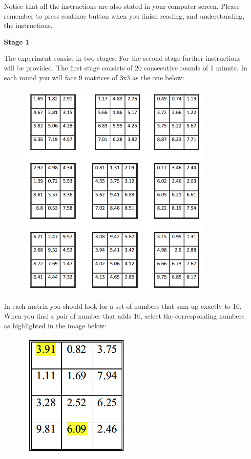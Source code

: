 \documentclass[a4paper, 12pt]{article}
\begin{document}
\begin{appendices}
Notice that all the instructions are also stated in your computer screen. Please remember to press continue button when you finish reading, and understanding, the instructions.

\begin{center}
\textbf{Stage 1}
\end{center}

The experiment consist in two stages. For the second stage further instructions will be provided. The first stage consists of 20 consecutive rounds of 1 minute. In each round you will face 9 matrices of 3x3 as the one below:

\begin{figure}[H]
\centering
\includegraphics[width=\textwidth,height=11cm,keepaspectratio]{figure_2.png}
\end{figure}

In each matrix you should look for a set of numbers that sum up exactly to 10. When you find a pair of number that adds 10, select the corresponding numbers as highlighted in the image below:

\begin{figure}[H]
\centering
\includegraphics[scale=0.6]{figure_1.png}
\end{figure}


\end{appendices}
\end{document}
